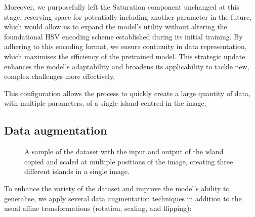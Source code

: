 Moreover, we purposefully left the Saturation component unchanged at this stage, reserving space for potentially including another parameter in the future, which would allow us to expand the model's utility without altering the foundational HSV encoding scheme established during its initial training. By adhering to this encoding format, we ensure continuity in data representation, which maximises the efficiency of the pretrained model. This strategic update enhances the model's adaptability and broadens its applicability to tackle new, complex challenges more effectively.

This configuration allows the process to quickly create a large quantity of data, with multiple parameters, of a single island centred in the image.

\subsection{Data augmentation}
\label{sec:coral-island-data-augmentation}

\begin{figure}[H]
\caption{A sample of the dataset with the input and output of the island copied and scaled at multiple positions of the image, creating three different islands in a single image.}
\label{fig:coral-island-cGAN-examples}
\end{figure}

To enhance the variety of the dataset and improve the model's ability to generalise, we apply several data augmentation techniques in addition to the usual affine transformations (rotation, scaling, and flipping):

